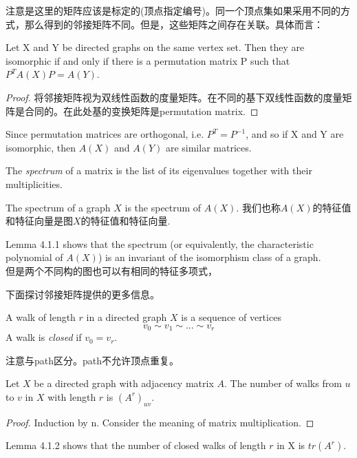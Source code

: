 \documentclass[11pt,fleqn]{book} %
\begin{document}
\begin{CJK}{UTF8}{gkai}
\begin{remark}
    注意是这里的矩阵应该是标定的(顶点指定编号)。同一个顶点集如果采用不同的方式，那么得到的邻接矩阵不同。但是，这些矩阵之间存在关联。具体而言：
\end{remark}

\begin{lemma}
    Let X and Y be directed graphs on the same vertex set. Then they are isomorphic if and only if there is a permutation matrix P such that $P^TA(X)P = A(Y)$.
\end{lemma}
\begin{proof}
    将邻接矩阵视为双线性函数的度量矩阵。在不同的基下双线性函数的度量矩阵是合同的。在此处基的变换矩阵是permutation matrix.
\end{proof}
\begin{remark}
    Since permutation matrices are orthogonal, i.e. $P^T = P^{-1}$, and so if X and Y are isomorphic, then $A(X)$ and $A(Y)$ are similar matrices.
\end{remark}
\begin{definition}
     The \textit{spectrum} of a matrix is the list of its eigenvalues together with their multiplicities.
\end{definition}
\begin{definition}
     The spectrum of a graph $X$ is the spectrum of $A(X)$. 我们也称$A(X)$的特征值和特征向量是图$X$的特征值和特征向量.
\end{definition}
\begin{remark}
    Lemma 4.1.1 shows that the spectrum (or equivalently, the characteristic polynomial of $A(X)$) is an invariant of the isomorphism class of a graph. \\
    但是两个不同构的图也可以有相同的特征多项式，
\end{remark}
下面探讨邻接矩阵提供的更多信息。

\begin{definition}
     A walk of length $r$ in a directed graph $X$ is a sequence of vertices
    \[
        v_0 \sim v_1 \sim ... \sim v_r\]
    A walk is \textit{closed} if $v_0 = v_r$.
\end{definition}
\begin{remark}
    注意与path区分。path不允许顶点重复。
\end{remark}

\begin{lemma}
    Let $X$ be a directed graph with adjacency matrix $A$. The number of walks from $u$ to $v$ in $X$ with length $r$ is $(A^r)_{uv}$.
\end{lemma}
\begin{proof}
    Induction by n. Consider the meaning of matrix multiplication.
\end{proof}
\begin{remark}
    Lemma 4.1.2 shows that the number of closed walks of length $r$ in X is $tr(A^r)$.
\end{remark}


\end{CJK}
\end{document}

